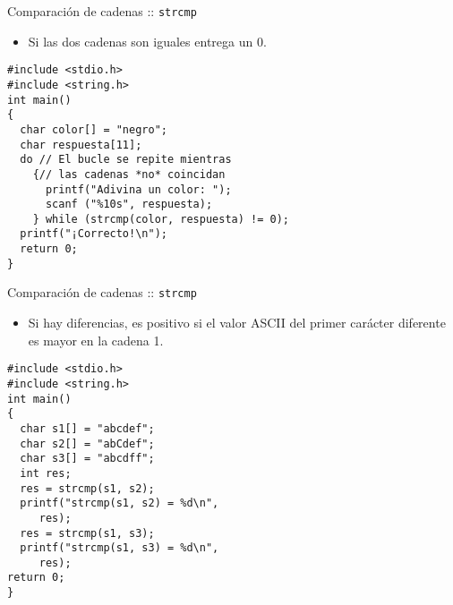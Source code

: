 \documentclass[xcolor={usenames,svgnames,dvipsnames}, aspectratio=169]{beamer}
\begin{document}
\begin{frame}[label={sec:org5212415},fragile]{Comparación de cadenas :: \texttt{strcmp}}
 \begin{itemize}
\item \alert{Si las dos cadenas son iguales entrega un 0}.
\end{itemize}

\lstset{language=C,label= ,caption= ,captionpos=b,numbers=none}
\begin{lstlisting}
#include <stdio.h>
#include <string.h>
int main()
{
  char color[] = "negro";
  char respuesta[11];
  do // El bucle se repite mientras
    {// las cadenas *no* coincidan
      printf("Adivina un color: ");
      scanf ("%10s", respuesta);
    } while (strcmp(color, respuesta) != 0);
  printf("¡Correcto!\n");
  return 0;
}
\end{lstlisting}
\end{frame}

\begin{frame}[label={sec:org522d868},fragile]{Comparación de cadenas :: \texttt{strcmp}}
 \begin{itemize}
\item Si hay diferencias, es positivo si el valor ASCII del primer carácter diferente es mayor en la cadena 1.
\end{itemize}

\lstset{language=C,label= ,caption= ,captionpos=b,numbers=none}
\begin{lstlisting}
#include <stdio.h>
#include <string.h>
int main()
{
  char s1[] = "abcdef";
  char s2[] = "abCdef";
  char s3[] = "abcdff";
  int res;
  res = strcmp(s1, s2);
  printf("strcmp(s1, s2) = %d\n",
	 res);
  res = strcmp(s1, s3);
  printf("strcmp(s1, s3) = %d\n",
	 res);
return 0;
}
\end{lstlisting}
\end{frame}
\end{document}
